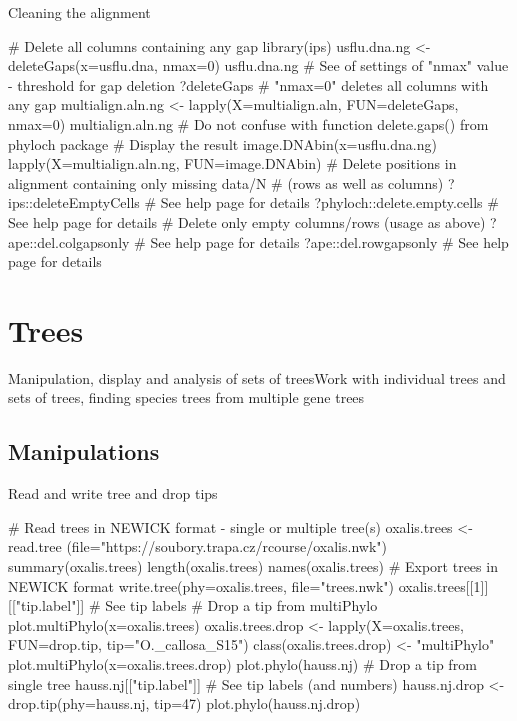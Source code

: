 \documentclass[compress, ucs, xelatex, 11pt, xcolor=svgnames,
  hyperref={
    bookmarks=true,
    unicode=true,
    colorlinks=true,
    pdftitle={Molecular data in R},
    plainpages=false,
    pdfauthor={Vojtech Zeisek},
    pdfsubject={Course about phylogeny and evolution in R},
    pdfcreator={XeLaTeX},
    pdfkeywords={R, evolution, phylogeny, molecular data},
    linkcolor=Tomato,
    anchorcolor=SaddleBrown,
    citecolor=Goldenrod,
    filecolor=DarkMagenta,
    menucolor=Sienna,
    urlcolor=DarkTurquoise,
    pdftex},
  url={hyphens, lowtilde} %
  ]{beamer}
\begin{document}
\begin{frame}[fragile]{Cleaning the alignment}
  \begin{spluscode}
    # Delete all columns containing any gap
    library(ips)
    usflu.dna.ng <- deleteGaps(x=usflu.dna, nmax=0)
    usflu.dna.ng
    # See of settings of "nmax" value - threshold for gap deletion
    ?deleteGaps # "nmax=0" deletes all columns with any gap
    multialign.aln.ng <- lapply(X=multialign.aln, FUN=deleteGaps, nmax=0)
    multialign.aln.ng
    # Do not confuse with function delete.gaps() from phyloch package
    # Display the result
    image.DNAbin(x=usflu.dna.ng)
    lapply(X=multialign.aln.ng, FUN=image.DNAbin)
    # Delete positions in alignment containing only missing data/N
    # (rows as well as columns)
    ?ips::deleteEmptyCells # See help page for details
    ?phyloch::delete.empty.cells # See help page for details
    # Delete only empty columns/rows (usage as above)
    ?ape::del.colgapsonly # See help page for details
    ?ape::del.rowgapsonly # See help page for details
  \end{spluscode}
\end{frame}

\section{Trees}

\begin{frame}{Manipulation, display and analysis of sets of trees}{Work with individual trees and sets of trees, finding species trees from multiple gene trees}
  \tableofcontents[currentsection, sectionstyle=show/hide, hideothersubsections]
\end{frame}

\subsection{Manipulations}

\begin{frame}[fragile]{Read and write tree and drop tips}
  \begin{spluscode}
    # Read trees in NEWICK format - single or multiple tree(s)
    oxalis.trees <- read.tree
      (file="https://soubory.trapa.cz/rcourse/oxalis.nwk")
    summary(oxalis.trees)
    length(oxalis.trees)
    names(oxalis.trees)
    # Export trees in NEWICK format
    write.tree(phy=oxalis.trees, file="trees.nwk")
    oxalis.trees[[1]][["tip.label"]] # See tip labels
    # Drop a tip from multiPhylo
    plot.multiPhylo(x=oxalis.trees)
    oxalis.trees.drop <- lapply(X=oxalis.trees, FUN=drop.tip,
      tip="O._callosa_S15")
    class(oxalis.trees.drop) <- "multiPhylo"
    plot.multiPhylo(x=oxalis.trees.drop)
    plot.phylo(hauss.nj) # Drop a tip from single tree
    hauss.nj[["tip.label"]] # See tip labels (and numbers)
    hauss.nj.drop <- drop.tip(phy=hauss.nj, tip=47)
    plot.phylo(hauss.nj.drop)
  \end{spluscode}
\end{frame}
\end{document}
